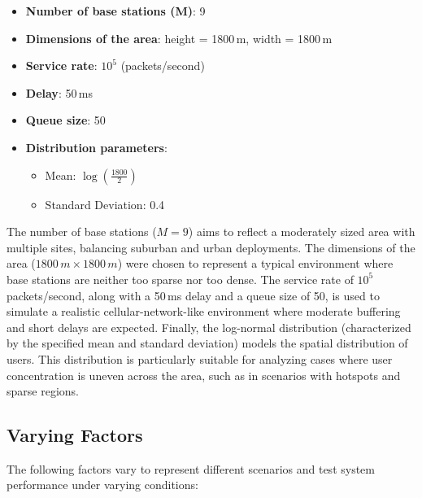 \documentclass{report}
\begin{document}
\begin{itemize}
    \item \textbf{Number of base stations (M)}: 9
    \item \textbf{Dimensions of the area}: height = 1800\,m, width = 1800\,m
    \item \textbf{Service rate}: $10^5$ (packets/second)
    \item \textbf{Delay}: 50\,ms
    \item \textbf{Queue size}: 50
    \item \textbf{Distribution parameters}:
    \begin{itemize}
        \item Mean: $\log \left(\frac{1800}{2}\right)$
        \item Standard Deviation: 0.4
    \end{itemize}
\end{itemize}
The number of base stations ($M = 9$) aims to reflect a moderately sized area with multiple sites, balancing suburban and urban deployments. The dimensions of the area ($1800\,m \times 1800\,m$) were chosen to represent a typical environment where base stations are neither too sparse nor too dense. The service rate of $10^5$ packets/second, along with a 50\,ms delay and a queue size of 50, is used to simulate a realistic cellular-network-like environment where moderate buffering and short delays are expected. Finally, the log-normal distribution (characterized by the specified mean and standard deviation) models the spatial distribution of users. This distribution is particularly suitable for analyzing cases where user concentration is uneven across the area, such as in scenarios with hotspots and sparse regions.

\subsection{Varying Factors}
The following factors vary to represent different scenarios and test system performance under varying conditions:
\end{document}
